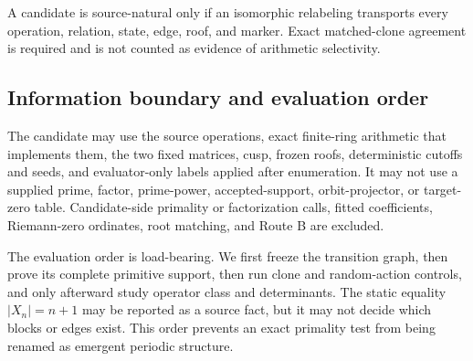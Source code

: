 \begin{convention}
\label{conv:source-natural}
A candidate is source-natural only if an isomorphic relabeling transports
every operation, relation, state, edge, roof, and marker.  Exact matched-clone
agreement is required and is not counted as evidence of arithmetic
selectivity.
\end{convention}

\subsection{Information boundary and evaluation order}

The candidate may use the source operations, exact finite-ring arithmetic
that implements them, the two fixed matrices, cusp, frozen roofs, deterministic
cutoffs and seeds, and evaluator-only labels applied after enumeration.  It
may not use a supplied prime, factor, prime-power, accepted-support,
orbit-projector, or target-zero table.  Candidate-side primality or
factorization calls, fitted coefficients, Riemann-zero ordinates, root
matching, and Route B are excluded.

The evaluation order is load-bearing.  We first freeze the transition graph,
then prove its complete primitive support, then run clone and random-action
controls, and only afterward study operator class and determinants.  The
static equality $|X_n|=n+1$ may be reported as a source fact, but it may not
decide which blocks or edges exist.  This order prevents an exact primality
test from being renamed as emergent periodic structure.

